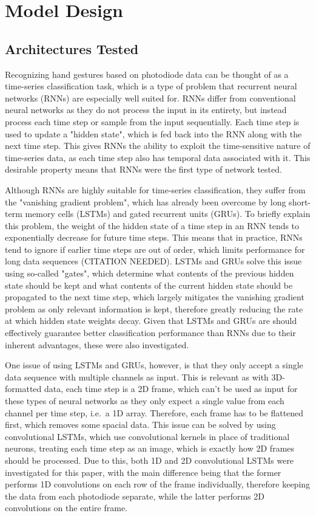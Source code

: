 \section{Model Design}\label{sec:model-design}
\subsection{Architectures Tested}\label{subsec:architectures-tested}
Recognizing hand gestures based on photodiode data can be thought of as a time-series classification task, which is a type of problem that recurrent neural networks (RNNs) are especially well suited for.
RNNs differ from conventional neural networks as they do not process the input in its entirety, but instead process each time step or sample from the input sequentially.
Each time step is used to update a "hidden state", which is fed back into the RNN along with the next time step.
This gives RNNs the ability to exploit the time-sensitive nature of time-series data, as each time step also has temporal data associated with it.
This desirable property means that RNNs were the first type of network tested.

Although RNNs are highly suitable for time-series classification, they suffer from the "vanishing gradient problem", which has already been overcome by long short-term memory cells (LSTMs) and gated recurrent units (GRUs).
To briefly explain this problem, the weight of the hidden state of a time step in an RNN tends to exponentially decrease for future time steps.
This means that in practice, RNNs tend to ignore if earlier time steps are out of order, which limits performance for long data sequences (CITATION NEEDED).
LSTMs and GRUs solve this issue using so-called "gates", which determine what contents of the previous hidden state should be kept and what contents of the current hidden state should be propagated to the next time step, which largely mitigates the vanishing gradient problem as only relevant information is kept, therefore greatly reducing the rate at which hidden state weights decay.
Given that LSTMs and GRUs are should effectively guarantee better classification performance than RNNs due to their inherent advantages, these were also investigated.

One issue of using LSTMs and GRUs, however, is that they only accept a single data sequence with multiple channels as input.
This is relevant as with 3D-formatted data, each time step is a 2D frame, which can't be used as input for these types of neural networks as they only expect a single value from each channel per time step, i.e.\ a 1D array.
Therefore, each frame has to be flattened first, which removes some spacial data.
This issue can be solved by using convolutional LSTMs, which use convolutional kernels in place of traditional neurons, treating each time step as an image, which is exactly how 2D frames should be processed.
Due to this, both 1D and 2D convolutional LSTMs were investigated for this paper, with the main difference being that the former performs 1D convolutions on each row of the frame individually, therefore keeping the data from each photodiode separate, while the latter performs 2D convolutions on the entire frame.

